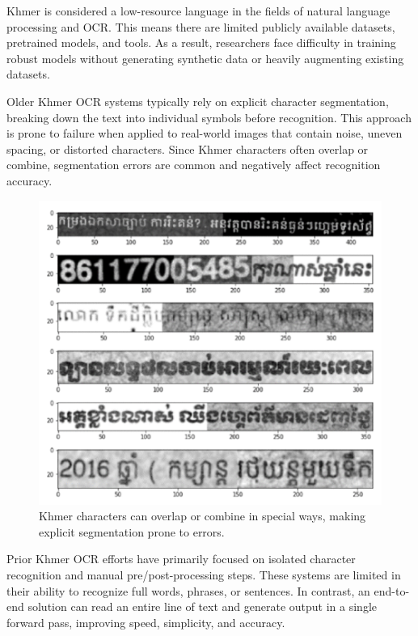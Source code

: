 Khmer is considered a low-resource language in the fields of natural language 
processing and OCR. This means there are limited publicly available datasets, 
pretrained models, and tools. As a result, researchers face difficulty in 
training robust models without generating synthetic data or heavily augmenting 
existing datasets.

Older Khmer OCR systems typically rely on explicit character segmentation, 
breaking down the text into individual symbols before recognition. 
This approach is prone to failure when applied to real-world images that 
contain noise, uneven spacing, or distorted characters. \citep{buoy2021seq2seq} Since Khmer characters 
often overlap or combine, segmentation errors are common and negatively affect 
recognition accuracy.

\begin{figure}[ht]
    \centering
    \includegraphics[width=\textwidth]{figures/overlap_segmentation.png}
    \caption{Khmer characters can overlap or combine in special ways, 
    making explicit segmentation prone to errors. \citep{buoy2021seq2seq}}
    \label{fig:overlap-segmentation}
\end{figure}

Prior Khmer OCR efforts have primarily focused on isolated character recognition 
and manual pre/post-processing steps. These systems are limited in their ability to 
recognize full words, phrases, or sentences. In contrast, an end-to-end solution can 
read an entire line of text and generate output in a single forward pass, 
improving speed, simplicity, and accuracy. \citep{buoy2021seq2seq}



